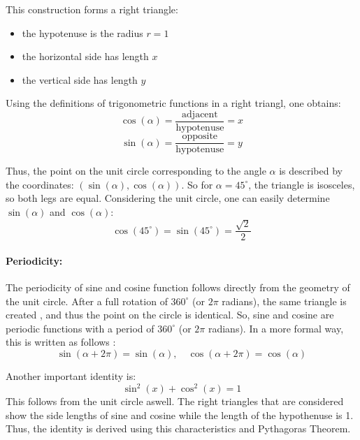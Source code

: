 This construction forms a right triangle:
\begin{itemize}
    \item the hypotenuse is the radius $r=1$
    \item the horizontal side has length $x$
    \item the vertical side has length $y$
\end{itemize}

Using the definitions of trigonometric functions in a right triangl, one obtains:
\begin{equation}
    \cos(\alpha) = \frac{\text{adjacent}}{\text{hypotenuse}} = x
\end{equation}
\begin{equation}
    \sin(\alpha) = \frac{\text{opposite}}{\text{hypotenuse}} = y
\end{equation}

Thus, the point on the unit circle corresponding to the angle $\alpha$ is described by the coordinates: $(\sin(\alpha), \cos(\alpha))$. 
So for $\alpha = 45^\circ$, the triangle is isosceles, so both legs are equal. Considering the unit circle, one can easily determine $\sin(\alpha)$ and $\cos(\alpha)$:
\begin{equation}
    \cos(45^\circ) = \sin(45^\circ) = \frac{\sqrt{2}}{2}
\end{equation}

\paragraph{Periodicity:}
The periodicity of sine and cosine function follows directly from the geometry of the unit circle. After a full rotation of $360^\circ$ (or $2\pi$ radians), the same  triangle is  created , and thus the point on the circle is identical. So, sine and cosine are periodic functions with a period of  $360^\circ$ (or $2\pi$ radians). 
In a more formal way, this is written as follows :
\begin{equation}
    \sin(\alpha + 2\pi) = \sin(\alpha), \quad \cos(\alpha + 2\pi) = \cos(\alpha)
\end{equation}

Another important identity is:
\begin{equation}
    \sin^2(x) + \cos^2(x) = 1
\end{equation}
This follows from the unit circle aswell. The right triangles that are considered show the side lengths of sine and cosine while the length of the hypothenuse is 1. Thus, the identity is derived using this characteristics and Pythagoras Theorem.  




